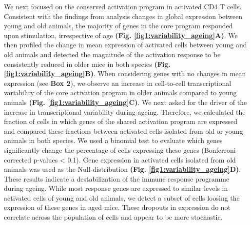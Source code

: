 We next focused on the conserved activation program in activated CD4\plus{} T cells. Consistent with the findings from analysis changes in global expression between young and old animals,  the majority of genes in the core program responded upon stimulation, irrespective of age \textbf{(Fig. \ref{fig1:variability_ageing}A)}. We then profiled the change in mean expression of activated cells between young and old animals and detected the magnitude of the activation response to be consistently reduced in older mice in both species \textbf{(Fig. \ref{fig1:variability_ageing}B)}. When considering genes with no changes in mean expression (see \textbf{Box 2}), we observe an increase in cell-to-cell transcriptional variability of the core activation program in older animals compared to young animals \textbf{(Fig. \ref{fig1:variability_ageing}C)}. We next asked for the driver of the increase in transcriptional variability during ageing. Therefore, we calculated the fraction of cells in which genes of the shared activation program are expressed and compared these fractions between activated cells isolated from old or young animals in both species. We used a binomial test to evaluate which genes significantly change the percentage of cells expressing these genes (Bonferroni corrected p-values < 0.1). Gene expression in activated cells isolated from old animals was used as the Null-distribution \textbf{(Fig. \ref{fig1:variability_ageing}D)}. \\

These results indicate a destabilization of the immune response programme during ageing. While most response genes are expressed to similar levels in activated cells of young and old animals, we detect a subset of cells loosing the expression of these genes in aged mice. These dropouts in expression do not correlate across the population of cells and appear to be more stochastic.

\newpage

